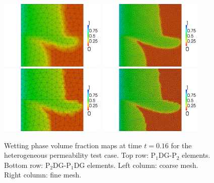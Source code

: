 \documentclass[times]{fldauth}
\newcommand{\PN}[2][error]{P$_{#1}$DG-P$_{#2}$}
\begin{document}
\begin{figure}[h!]
  \centering
  \includegraphics[width=0.45\textwidth]{CG_coarse083.png}
  \includegraphics[width=0.45\textwidth]{CG_fine083.png}
  \includegraphics[width=0.45\textwidth]{DG_coarse083.png}
  \includegraphics[width=0.45\textwidth]{DG_fine083.png}
  \caption{Wetting phase volume fraction maps at time $t=0.16$ for the
    heterogeneous permeability test case. Top row: \PN[1]{2}
    elements. Bottom row: \PN[2]{1}DG elements. Left column: coarse
    mesh. Right column: fine mesh. \label{fig:4reg_maps}}%
\end{figure}
\end{document}
